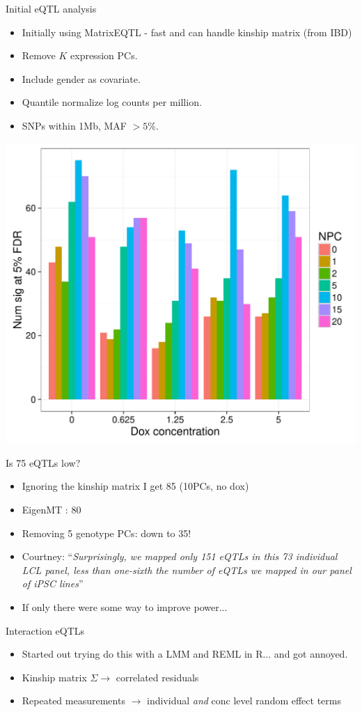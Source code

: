 \documentclass{beamer}
\begin{document}
\begin{frame}{Initial eQTL analysis}
\begin{itemize}
\item Initially using MatrixEQTL - fast and can handle kinship matrix (from IBD)
\item Remove $K$ expression PCs.
\item Include gender as covariate. 
\item Quantile normalize log counts per million. 
\item SNPs within 1Mb, MAF $>5\%$. 
\end{itemize}
\centering
\includegraphics[width=.6\textwidth,clip,trim=0 0 0 0]{../figures/matrixEQTL_nsig.pdf}
\end{frame}

\begin{frame}{Is 75 eQTLs low?}
\begin{itemize}
\item Ignoring the kinship matrix I get 85 (10PCs, no dox)
\item EigenMT \citep{davis2016efficient}: 80
\item Removing 5 genotype PCs: down to 35! 
\item Courtney: ``\emph{Surprisingly, we mapped only 151 eQTLs in this 73 individual LCL panel, less than one-sixth the number of eQTLs we mapped in our panel of iPSC lines}''
\item If only there were some way to improve power...
\end{itemize}
\end{frame}

\begin{frame}{Interaction eQTLs}
\begin{itemize}
\item Started out trying do this with a LMM and REML in R... and got annoyed. 
\item Kinship matrix $\Sigma \rightarrow$ correlated residuals
\item Repeated measurements $\rightarrow$ individual \emph{and} conc level random effect terms
\end{itemize}
\end{frame}
\end{document}
